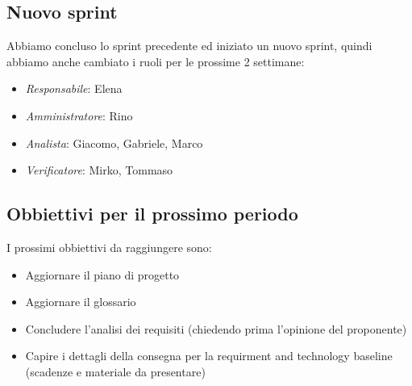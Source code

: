 \subsection{Nuovo sprint}
Abbiamo concluso lo sprint precedente ed iniziato un nuovo sprint, quindi abbiamo anche cambiato i ruoli per le prossime 2 settimane:
\begin{itemize}
\item \textit{Responsabile}: Elena
\item \textit{Amministratore}: Rino
\item \textit{Analista}: Giacomo, Gabriele, Marco
\item \textit{Verificatore}: Mirko, Tommaso
\end{itemize}

\subsection{Obbiettivi per il prossimo periodo}
I prossimi obbiettivi da raggiungere sono:
\begin{itemize}
\item Aggiornare il piano di progetto
\item Aggiornare il glossario
\item Concludere l'analisi dei requisiti (chiedendo prima l'opinione del proponente)
\item Capire i dettagli della consegna per la requirment and technology baseline (scadenze e materiale da presentare)
\end{itemize}

